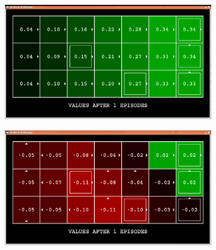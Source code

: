\documentclass[11pt]{article}
\begin{document}
\begin{figure}[h]
\centering
\begin{subfigure}{0.9\textwidth}
	\includegraphics[width=\textwidth]{figure/hybird_walk}
\end{subfigure}
\begin{subfigure}{0.9\textwidth}
	\includegraphics[width=\textwidth]{figure/hybird_obstacle}
\end{subfigure}
\label{fig:rep}
\end{figure}
\end{document}
